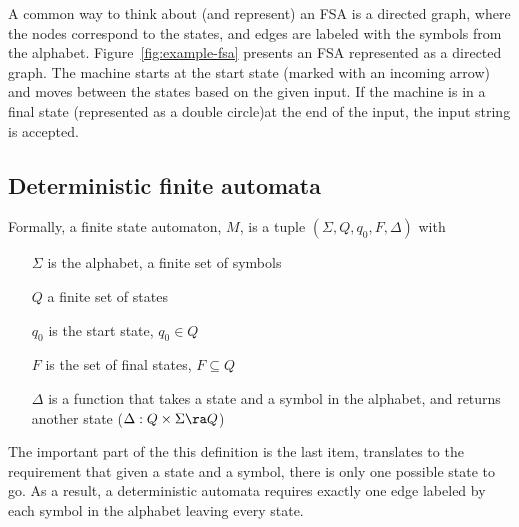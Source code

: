 \begin{marginfigure}
  \begin{center}
    \tikzset{external/export next=false}
  \end{center}
    \caption{\label{fig:example-fsa}%
      An example finite-state machine.
    }
\end{marginfigure}
A common way to think about (and represent) an FSA is a directed graph,
where the nodes correspond to the states,
and edges are labeled with the symbols from the alphabet.
Figure~\ref{fig:example-fsa} presents an FSA represented as
a directed graph.
The machine starts at the start state (marked with an incoming arrow)
and moves between the states based on the given input.
If the machine is in a final state
(represented as a double circle)at the end of the input,
the input string is accepted.

\subsection{Deterministic finite automata}
Formally, a finite state automaton, $M$,
is a tuple $(\Sigma,Q, q_{0}, F, \Delta)$ with

\begin{itemize}[nosep]
  \item[$\Sigma$] is the alphabet, a finite set of symbols
  \item[$Q$] a finite set of states
  \item[$q_{0}$] is the start state, $q_{0} \in Q$
  \item[$F$] is the set of final states, $F \subseteq Q$
  \item[$\Delta$] is a function that takes a state and a symbol in the alphabet,
    and returns another state ($\Delta: Q\times\Sigma \ra Q$)
\end{itemize}

The important part of the this definition is the last item,
translates to the requirement that given a state and a symbol,
there is only one possible state to go.
As a result,
a deterministic automata requires
exactly one edge labeled by each symbol in the alphabet leaving every state.
